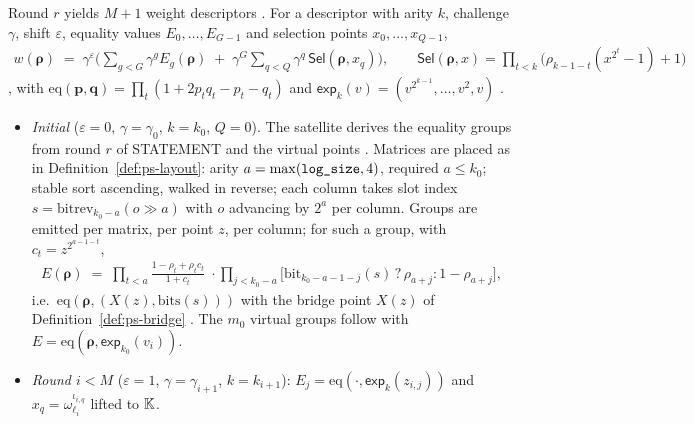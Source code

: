 \begin{definition}
\label{def:sv-weight}
Round $r$ yields $M+1$ weight descriptors .
For a descriptor with arity $k$, challenge $\gamma$, shift $\varepsilon$, equality
values $E_0,\dots,E_{G-1}$ and selection points $x_0,\dots,x_{Q-1}$,
\begin{align}
  w(\boldsymbol\rho) \;=\; \gamma^{\varepsilon}\Big(\sum_{g<G}\gamma^{g} E_g(\boldsymbol\rho)
  \;+\; \gamma^{G}\sum_{q<Q} \gamma^{q}\, \mathsf{Sel}(\boldsymbol\rho, x_q)\Big),
  \qquad
  \mathsf{Sel}(\boldsymbol\rho, x) = \prod_{t<k}\big(\rho_{k-1-t}(x^{2^t}-1)+1\big)
\end{align}
, with
$\mathrm{eq}(\mathbf p,\mathbf q) = \prod_t (1 + 2p_tq_t - p_t - q_t)$ and
$\mathsf{exp}_k(v) = (v^{2^{k-1}},\dots,v^2,v)$ .
\begin{itemize}
\item \emph{Initial} ($\varepsilon=0$, $\gamma=\gamma_0$, $k = k_0$, $Q=0$). The
  satellite derives the equality groups from round $r$ of STATEMENT and the
  virtual points . Matrices are placed
  as in Definition~\ref{def:ps-layout}: arity $a = \max(\texttt{log\_size}, 4)$,
  required $a \le k_0$; stable sort ascending, walked in reverse; each column takes
  slot index $s = \mathrm{bitrev}_{k_0-a}(o \gg a)$ with $o$ advancing by $2^a$
  per column. Groups are emitted per matrix, per point $z$, per column; for such a
  group, with $c_t = z^{2^{a-1-t}}$,
  \begin{align}
    E(\boldsymbol\rho) \;=\; \prod_{t<a}\frac{1-\rho_t+\rho_t c_t}{1+c_t}
    \;\cdot \prod_{j<k_0-a} \big[\mathrm{bit}_{k_0-a-1-j}(s)\,?\,\rho_{a+j} : 1-\rho_{a+j}\big],
  \end{align}
  i.e.\ $\mathrm{eq}(\boldsymbol\rho, (X(z), \mathrm{bits}(s)))$ with the
  bridge point $X(z)$ of Definition~\ref{def:ps-bridge}
  . The $m_0$ virtual groups follow with
  $E = \mathrm{eq}(\boldsymbol\rho, \mathsf{exp}_{k_0}(v_i))$.
\item \emph{Round $i<M$} ($\varepsilon = 1$, $\gamma = \gamma_{i+1}$,
  $k = k_{i+1}$): $E_j = \mathrm{eq}(\cdot, \mathsf{exp}_{k}(z_{i,j}))$ and
  $x_q = \omega_{\ell_i}^{\iota_{i,q}}$ lifted to $\mathbb{K}$.
\end{itemize}
\end{definition}

